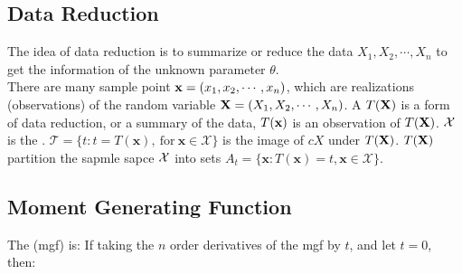 \documentclass[12pt]{report}
\begin{document}
\subsection{Data Reduction}

The idea of data reduction is to summarize or reduce the data $X_1,X_2,\cdots,X_n$ to get the information of the unknown parameter $\theta$.\\
There are many sample point $\bold{x}=(x_1,x_2,\cdots,x_n)$, which are realizations (observations) of the random variable $\bold{X}=(X_1,X_2,\cdots,X_n)$.
A  $T(\bold{X})$ is a form of data reduction, or a summary of the data, $T(\bold{x})$ is an observation of $T(\bold{X})$. $\mathcal{X}$ is
the . $\mathcal{T}=\{t:t=T(\mathbf{x}),\mathrm{~for~}\mathbf{x}\in\mathcal{X}\}$ is the image of $cX$ under $T(\bold{X})$.
$T(\bold{X})$ partition the sapmle sapce $\mathcal{X}$ into sets $A_t=\{\mathbf{x}:T(\mathbf{x})=t,\mathbf{x}\in\mathcal{X}\}$.

\subsection{Moment Generating Function}
The  (mgf) is:
If taking the $n$ order derivatives of the mgf by $t$, and let $t=0$, then:
\end{document}
